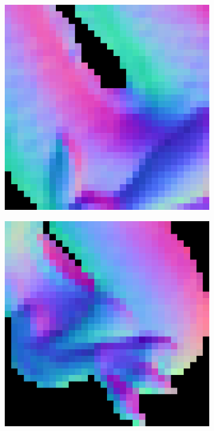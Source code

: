\begin{figure}[th]
\begin{subfigure}[b]{0.18\linewidth}
	\end{subfigure}
	\begin{subfigure}[b]{0.18\linewidth}
		\includegraphics[width=\linewidth]{./Figures/gcnn_synthetic/eval_7_32_12_normal.png}
	\end{subfigure}
	\begin{subfigure}[b]{0.18\linewidth}
		\includegraphics[width=\linewidth]{./Figures/gcnn_synthetic/eval_7_42_-28_normal.png}

\end{subfigure}
\end{figure}
